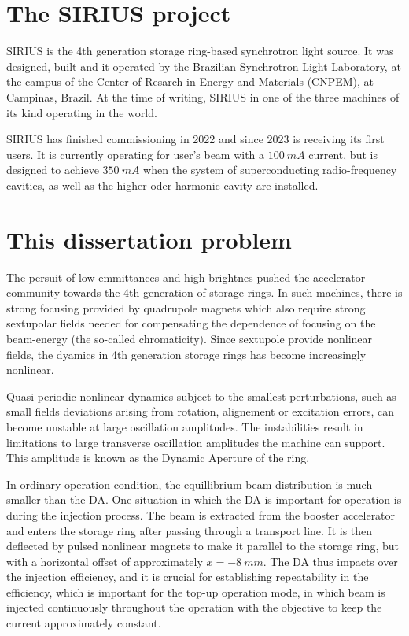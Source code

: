 \section{The SIRIUS project}
SIRIUS is the 4th generation storage ring-based synchrotron light source. It was designed, built and it operated by the Brazilian Synchrotron Light Laboratory, at the campus of the Center of Resarch in Energy and Materials (CNPEM), at Campinas, Brazil. At the time of writing, SIRIUS in one of the three machines of its kind operating in the world.

SIRIUS has finished commissioning in 2022 and since 2023 is receiving its first users. It is currently operating for user's beam with a $100~\unit{mA}$ current, but is designed to achieve $350~\unit{mA}$ when the system of superconducting radio-frequency cavities, as well as the higher-oder-harmonic cavity are installed.

\section{This dissertation problem}
    The persuit of low-emmittances and high-brightnes pushed the accelerator community towards the 4th generation of storage rings. In such machines, there is strong focusing provided by quadrupole magnets which also require strong sextupolar fields needed for compensating the dependence of focusing on the beam-energy (the so-called chromaticity). Since sextupole provide nonlinear fields, the dyamics in 4th generation storage rings has become increasingly nonlinear.

    Quasi-periodic nonlinear dynamics subject to the smallest perturbations, such as small fields deviations arising from rotation, alignement or excitation errors, can become unstable at large oscillation amplitudes. The instabilities result in limitations to large transverse oscillation amplitudes the machine can support. This amplitude is known as the Dynamic Aperture of the ring.

    In ordinary operation condition, the equillibrium beam distribution is much smaller than the DA. One situation in which the DA is important for operation is during the injection process. The beam is extracted from the booster accelerator and enters the storage ring after passing through a transport line. It is then deflected by pulsed nonlinear magnets to make it parallel to the storage ring, but with a horizontal offset of approximately $x=-8~\unit{mm}$. The DA thus impacts over the injection efficiency, and it is crucial for establishing repeatability in the efficiency, which is important for the top-up operation mode, in which beam is injected continuously throughout the operation with the objective to keep the current approximately constant.

